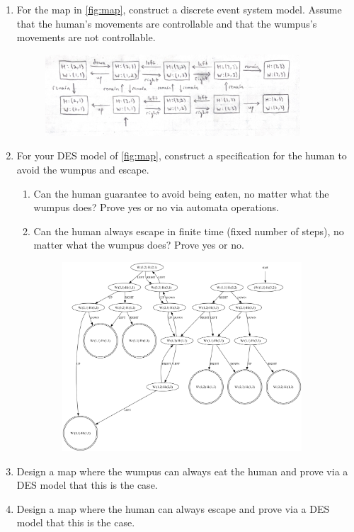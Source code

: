 \documentclass[12pt,letterpaper]{ntdhw}
\begin{document}
\begin{enumerate}

  \item For the map in \ref{fig:map}, construct a discrete event
  system model.  Assume that the human's movements are controllable
  and that the wumpus's movements are not controllable.

  \begin{figure}[ht]
      \centering
      \includegraphics[width=0.9\textwidth]{2_human.png}
  \end{figure}

\clearpage

  \item For your DES model of \ref{fig:map}, construct a specification
  for the human to avoid the wumpus and escape.
  \begin{enumerate}
    \item Can the human guarantee to avoid being eaten, no matter what
    the wumpus does?  Prove yes or no via automata operations.
    \item Can the human always escape in finite time (fixed
    number of steps), no matter what the wumpus does?  Prove yes or
    no.

    \begin{figure}[ht]
      \centering
      \includegraphics[width=0.9\textwidth]{wumpus2b.png}
  \end{figure}
  \end{enumerate}

  \item Design a map where the wumpus can always eat the human and
  prove via a DES model that this is the case.

  \item Design a map where the human can always escape and prove via a
  DES model that this is the case.

\end{enumerate}
\end{document}
